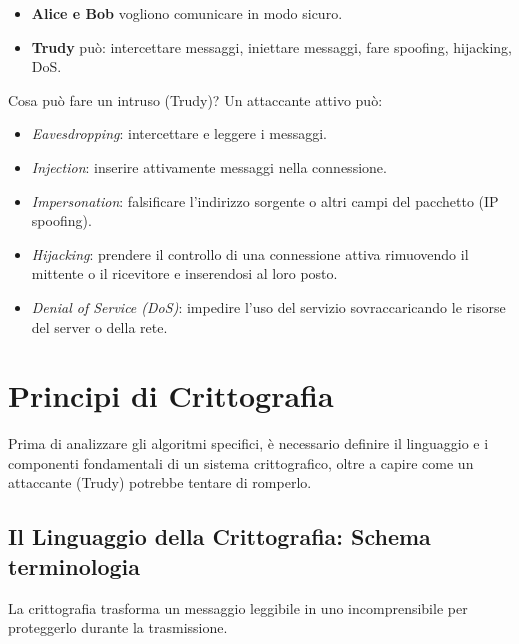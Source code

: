 \documentclass[a4paper,12pt]{report}
\begin{document}
\begin{itemize}[noitemsep]
  \item \textbf{Alice e Bob} vogliono comunicare in modo sicuro.
  \item \textbf{Trudy} pu\`o: intercettare messaggi, iniettare messaggi,
        fare spoofing, hijacking, DoS.
\end{itemize}
\begin{notebox}{Cosa può fare un intruso (Trudy)?}
Un attaccante attivo può:
\begin{itemize}
    \item \textit{Eavesdropping}: intercettare e leggere i messaggi.
    \item \textit{Injection}: inserire attivamente messaggi nella connessione.
    \item \textit{Impersonation}: falsificare l'indirizzo sorgente o altri campi del pacchetto (IP spoofing).
    \item \textit{Hijacking}: prendere il controllo di una connessione attiva rimuovendo il mittente o il ricevitore e inserendosi al loro posto.
    \item \textit{Denial of Service (DoS)}: impedire l'uso del servizio sovraccaricando le risorse del server o della rete.
\end{itemize}
\end{notebox}


\newpage
\section{Principi di Crittografia}

Prima di analizzare gli algoritmi specifici, è necessario definire il linguaggio e i componenti fondamentali di un sistema crittografico, oltre a capire come un attaccante (Trudy) potrebbe tentare di romperlo.

\subsection{Il Linguaggio della Crittografia: Schema terminologia}

La crittografia trasforma un messaggio leggibile in uno incomprensibile per proteggerlo durante la trasmissione.
\end{document}
